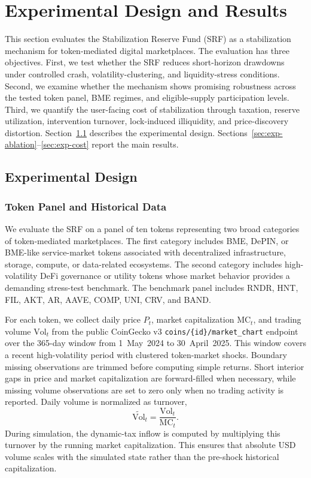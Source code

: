 \documentclass[a4paper,fleqn]{cas-dc}
\begin{document}
\section{Experimental Design and Results}
\label{sec:experiments}

This section evaluates the Stabilization Reserve Fund (SRF) as a stabilization mechanism for token-mediated digital marketplaces. The evaluation has three objectives. First, we test whether the SRF reduces short-horizon drawdowns under controlled crash, volatility-clustering, and liquidity-stress conditions. Second, we examine whether the mechanism shows promising robustness across the tested token panel, BME regimes, and eligible-supply participation levels. Third, we quantify the user-facing cost of stabilization through taxation, reserve utilization, intervention turnover, lock-induced illiquidity, and price-discovery distortion. Section~\ref{sec:exp-design} describes the experimental design. Sections~\ref{sec:exp-ablation}--\ref{sec:exp-cost} report the main results.

\subsection{Experimental Design}
\label{sec:exp-design}

\subsubsection{Token Panel and Historical Data}

We evaluate the SRF on a panel of ten tokens representing two broad categories of token-mediated marketplaces. The first category includes BME, DePIN, or BME-like service-market tokens associated with decentralized infrastructure, storage, compute, or data-related ecosystems. The second category includes high-volatility DeFi governance or utility tokens whose market behavior provides a demanding stress-test benchmark. The benchmark panel includes RNDR, HNT, FIL, AKT, AR, AAVE, COMP, UNI, CRV, and BAND. 

For each token, we collect daily price \(P_t\), market capitalization \(\mathrm{MC}_t\), and trading volume \(\mathrm{Vol}_t\) from the public CoinGecko v3 \texttt{coins/\{id\}/market\_chart} endpoint over the 365-day window from 1~May~2024 to 30~April~2025. This window covers a recent high-volatility period with clustered token-market shocks. Boundary missing observations are trimmed before computing simple returns. Short interior gaps in price and market capitalization are forward-filled when necessary, while missing volume observations are set to zero only when no trading activity is reported. Daily volume is normalized as turnover,
\[
\widetilde{\mathrm{Vol}}_t = \frac{\mathrm{Vol}_t}{\mathrm{MC}_t}.
\]
During simulation, the dynamic-tax inflow is computed by multiplying this turnover by the running market capitalization. This ensures that absolute USD volume scales with the simulated state rather than the pre-shock historical capitalization.
\end{document}
